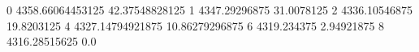 0 4358.66064453125 42.37548828125
1 4347.29296875 31.0078125
2 4336.10546875 19.8203125
4 4327.14794921875 10.86279296875
6 4319.234375 2.94921875
8 4316.28515625 0.0
